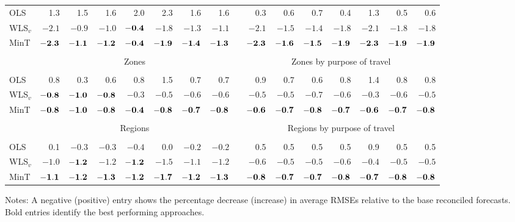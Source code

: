 \documentclass[twocolumn]{svjour3}
\begin{document}
\begin{table*}[!htb]
\begin{threeparttable}
\begin{tabular}{lrrrrrrrrrrrrrrr}
			\cline{2-8}\cline{10-16} \\[-0.3cm]
			OLS & 1.3 & 1.5 & 1.6 & 2.0 & 2.3 & 1.6 & 1.6 & & 0.3 & 0.6 & 0.7 & 0.4 & 1.3 & 0.5 & 0.6 \\
			WLS$_v$ & $-2.1$ & $-0.9$ & $-1.0$ & $\bf{ -0.4}$ & $-1.8$ & $-1.3$ & $-1.1$ & & $-2.1$ & $-1.5$ & $-1.4$ & $-1.8$ & $-2.1$ & $-1.8$ & $-1.8$ \\
			MinT & $\bf{ -2.3}$ & $\bf{ -1.1}$ & $\bf{ -1.2}$ & $\bf{ -0.4}$ & $\bf{ -1.9}$ & $\bf{ -1.4}$ & $\bf{ -1.3}$ & & $\bf{ -2.3}$ & $\bf{ -1.6}$ & $\bf{ -1.5}$ & $\bf{ -1.9}$ & $\bf{ -2.3}$ & $\bf{ -1.9}$ & $\bf{ -1.9}$ \\
			\cline{2-8}\cline{10-16} \\[-0.3cm]
			& \multicolumn{7}{c}{Zones} & & \multicolumn{7}{c}{Zones by purpose of travel} \\
			\cline{2-8}\cline{10-16} \\[-0.3cm]
			OLS & 0.8 & 0.3 & 0.6 & 0.8 & 1.5 & 0.7 & 0.7 & & 0.9 & 0.7 & 0.6 & 0.8 & 1.4 & 0.8 & 0.8 \\
			WLS$_v$ & $\bf{ -0.8}$ & $\bf{ -1.0}$ & $\bf{ -0.8}$ & $-0.3$ & $-0.5$ & $-0.6$ & $-0.6$ & & $-0.5$ & $-0.5$ & $-0.7$ & $-0.6$ & $-0.3$ & $-0.6$ & $-0.5$ \\
			MinT & $\bf{ -0.8}$ & $\bf{ -1.0}$ & $\bf{ -0.8}$ & $\bf{ -0.4}$ & $\bf{ -0.8}$ & $\bf{ -0.7}$ & $\bf{ -0.8}$ & & $\bf{ -0.6}$ & $\bf{ -0.7}$ & $\bf{ -0.8}$ & $\bf{ -0.7}$ & $\bf{ -0.6}$ & $\bf{ -0.7}$ & $\bf{ -0.8}$ \\
			\cline{2-8}\cline{10-16} \\[-0.3cm]
			& \multicolumn{7}{c}{Regions} & & \multicolumn{7}{c}{Regions by purpose of travel} \\
			\cline{2-8}\cline{10-16} \\[-0.3cm]
			OLS & 0.1 & $-0.3$ & $-0.3$ & $-0.4$ & 0.0 & $-0.2$ & $-0.2$ & & 0.5 & 0.5 & 0.5 & 0.5 & 0.9 & 0.5 & 0.5\\
			WLS$_v$ & $-1.0$ & $\bf{ -1.2}$ & $-1.2$ & $\bf{ -1.2}$ & $-1.5$ & $-1.1$ & $-1.2$ & & $-0.6$ & $-0.5$ & $-0.5$ & $-0.6$ & $-0.4$ & $-0.5$ & $-0.5$ \\
			MinT & $\bf{ -1.1}$ & $\bf{ -1.2}$ & $\bf{ -1.3}$ & $\bf{ -1.2}$ & $\bf{ -1.7}$ & $\bf{ -1.2}$ & $\bf{ -1.3}$ & & $\bf{ -0.8}$ & $\bf{ -0.7}$ & $\bf{ -0.7}$ & $\bf{ -0.8}$ & $\bf{ -0.7}$ & $\bf{ -0.8}$ & $\bf{ -0.8}$ \\
			\bottomrule
		\end{tabular}
		\begin{tablenotes}
			\item Notes: A negative (positive) entry shows the percentage decrease (increase) in average RMSEs relative to the base reconciled forecasts. Bold entries identify the best performing approaches.
		\end{tablenotes}
	\end{threeparttable}
\end{table*}
\end{document}
